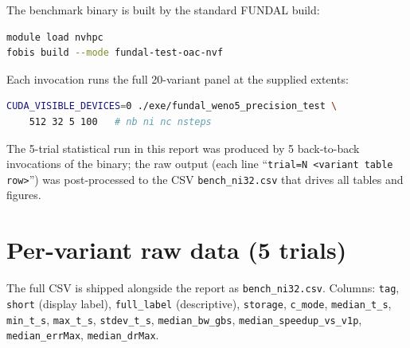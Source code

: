 \documentclass[11pt,a4paper]{article}
\begin{document}
The benchmark binary is built by the standard FUNDAL build:
\begin{lstlisting}[language=bash]
module load nvhpc
fobis build --mode fundal-test-oac-nvf
\end{lstlisting}
Each invocation runs the full 20-variant panel at the supplied extents:
\begin{lstlisting}[language=bash]
CUDA_VISIBLE_DEVICES=0 ./exe/fundal_weno5_precision_test \
    512 32 5 100   # nb ni nc nsteps
\end{lstlisting}
The 5-trial statistical run in this report was produced by 5
back-to-back invocations of the binary; the raw output (each line
``\texttt{trial=N <variant table row>}'') was post-processed to the
CSV \texttt{bench\_ni32.csv} that drives all tables and figures.

\section{Per-variant raw data (5 trials)}
\label{app:raw}

The full CSV is shipped alongside the report as
\texttt{bench\_ni32.csv}. Columns: \texttt{tag}, \texttt{short}
(display label), \texttt{full\_label} (descriptive), \texttt{storage},
\texttt{c\_mode}, \texttt{median\_t\_s}, \texttt{min\_t\_s},
\texttt{max\_t\_s}, \texttt{stdev\_t\_s}, \texttt{median\_bw\_gbs},
\texttt{median\_speedup\_vs\_v1p}, \texttt{median\_errMax},
\texttt{median\_drMax}.
\end{document}

